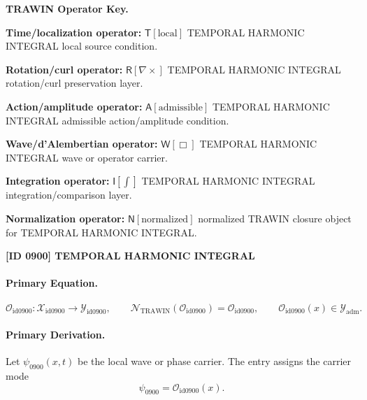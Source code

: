 \par\vspace{0.45\baselineskip}
\noindent\begin{minipage}[t]{\linewidth}
\begingroup
\small
\raggedright
\textbf{TRAWIN Operator Key.}\par
\noindent\textbf{Time/localization operator:} $\mathsf{T}\!\left[\mathrm{local}\right]$ TEMPORAL HARMONIC INTEGRAL local source condition.\par
\noindent\textbf{Rotation/curl operator:} $\mathsf{R}\!\left[\nabla\times\right]$ TEMPORAL HARMONIC INTEGRAL rotation/curl preservation layer.\par
\noindent\textbf{Action/amplitude operator:} $\mathsf{A}\!\left[\mathrm{admissible}\right]$ TEMPORAL HARMONIC INTEGRAL admissible action/amplitude condition.\par
\noindent\textbf{Wave/d'Alembertian operator:} $\mathsf{W}\!\left[\Box\right]$ TEMPORAL HARMONIC INTEGRAL wave or operator carrier.\par
\noindent\textbf{Integration operator:} $\mathsf{I}\!\left[\int\right]$ TEMPORAL HARMONIC INTEGRAL integration/comparison layer.\par
\noindent\textbf{Normalization operator:} $\mathsf{N}\!\left[\mathrm{normalized}\right]$ normalized TRAWIN closure object for TEMPORAL HARMONIC INTEGRAL.\par
\endgroup
\end{minipage}

\clearpage
\noindent\textbf{[ID 0900] TEMPORAL HARMONIC INTEGRAL}\par
\vspace{0.35em}
\paragraph{Primary Equation.}
\[
\mathcal{O}_{\mathrm{id0900}}:\mathcal{X}_{\mathrm{id0900}}\longrightarrow \mathcal{Y}_{\mathrm{id0900}},\qquad
\mathcal{N}_{\mathrm{TRAWIN}}(\mathcal{O}_{\mathrm{id0900}})=\mathcal{O}_{\mathrm{id0900}},\qquad
\mathcal{O}_{\mathrm{id0900}}(x)\in\mathcal{Y}_{\mathrm{adm}}.
\]

\paragraph{Primary Derivation.} Let $\psi_{0900}(x,t)$ be the local wave or phase carrier.  The entry assigns the carrier mode\[
\psi_{0900}=\mathcal{O}_{\mathrm{id0900}}(x).
\]

